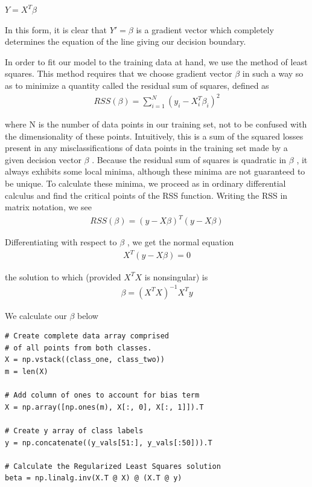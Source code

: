 \documentclass[journal,12pt,twocolumn]{IEEEtran}
\begin{document}
$Y=X^{T}\beta$
 
In this form, it is clear that  $Y'=\beta$  is a gradient vector which completely determines the equation of the line giving our decision boundary.

In order to fit our model to the training data at hand, we use the method of least squares. This method requires that we choose gradient vector  $\beta$  in such a way so as to minimize a quantity called the residual sum of squares, defined as
\begin{align}
    RSS(\beta)=\sum_{i=1}^{N}(y_{i}-X^{T}_{i}\beta_{i})^2
\end{align}

 
where  N  is the number of data points in our training set, not to be confused with the dimensionality of these points. Intuitively, this is a sum of the squared losses present in any misclassifications of data points in the training set made by a given decision vector  $\beta$ . Because the residual sum of squares is quadratic in  $\beta$ , it always exhibits some local minima, although these minima are not guaranteed to be unique. To calculate these minima, we proceed as in ordinary differential calculus and find the critical points of the RSS function. Writing the RSS in matrix notation, we see
\begin{align}
    RSS(\beta)=(y-X\beta)^{T}(y-X\beta)
\end{align}

 
Differentiating with respect to  $\beta$ , we get the normal equation
\begin{align}
  X^{T}(y-X\beta)=0  
\end{align}

 
the solution to which (provided  $X^{T}X$  is nonsingular) is
\begin{align}
    \beta=(X^{T}X)^{-1}X^{T}y
\end{align}

 
We calculate our  $\beta$  below
\begin{lstlisting}
# Create complete data array comprised
# of all points from both classes.
X = np.vstack((class_one, class_two))
m = len(X)

# Add column of ones to account for bias term
X = np.array([np.ones(m), X[:, 0], X[:, 1]]).T

# Create y array of class labels
y = np.concatenate((y_vals[51:], y_vals[:50])).T

# Calculate the Regularized Least Squares solution
beta = np.linalg.inv(X.T @ X) @ (X.T @ y)
\end{lstlisting}
\end{document}
